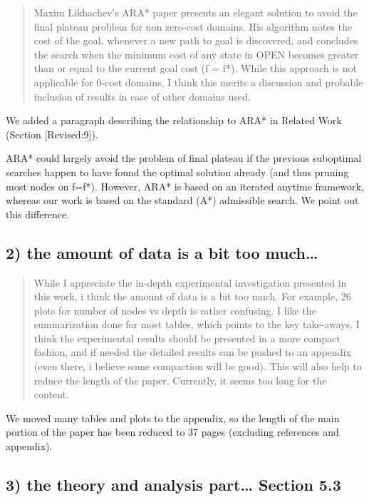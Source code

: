 \documentclass{article}
\begin{document}
\begin{quote}
 Maxim Likhachev's ARA* paper presents an elegant solution to
avoid the final plateau problem for non zero-cost domains. His
algorithm notes the cost of the goal, whenever a new path to goal is
discovered, and concludes the search when the minimum cost of any
state in OPEN becomes greater than or equal to the current goal cost
(f = f*). While this approach is not applicable for 0-cost domains, I
think this merits a discussion and probable inclusion of results in
case of other domains used.
\end{quote}

We added a paragraph describing the relationship to ARA* in Related Work (Section [Revised:9]).

ARA* could largely avoid the problem of final plateau if the previous suboptimal searches happen to
have found the optimal solution already (and thus pruning most nodes on f=f*). 
However, ARA* is based on an iterated anytime framework, whereas our work is based on the standard (A*) admissible search.
We point out this difference.


\subsection{2) the amount of data is a bit too much\ldots{}}
\label{sec:orgheadline15}

\begin{quote}
 While I appreciate the in-depth experimental investigation
presented in this work, i think the amount of data is a bit too much.
For example, 26 plots for number of nodes vs depth is rather
confusing. I like the summarization done for most tables, which points
to the key take-aways. I think the experimental results should be
presented in a more compact fashion, and if needed the detailed
results can be pushed to an appendix (even there, i believe some
compaction will be good). This will also help to reduce the length of
the paper. Currently, it seems too long for the content.
\end{quote}

We moved many tables and plots to the appendix, so the length of the main portion of the paper has been reduced to 37 pages (excluding references and appendix).

\subsection{\label{orgtarget2} 3) the theory and analysis part\ldots{} Section 5.3}
\label{sec:orgheadline16}
\end{document}
